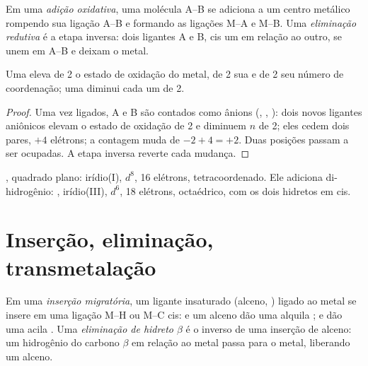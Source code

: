 \begin{definition}\label{def:b2:catalytic-cycles:oxidative-addition}
Em uma \emph{adição oxidativa}, uma molécula A--B se
adiciona a um centro metálico rompendo sua ligação A--B e formando as ligações
M--A e M--B. Uma \emph{eliminação redutiva} é a
etapa inversa: dois ligantes A e B, cis um em relação ao outro, se unem em
A--B e deixam o metal.
\end{definition}

\begin{proposition}\label{prop:b2:catalytic-cycles:oa}
Uma  eleva de 2 o estado de oxidação do metal, de 2 sua
 e de 2 seu número de coordenação; uma
 diminui cada um de 2.
\end{proposition}

\begin{proof}
Uma vez ligados, A e B são contados como ânions (, , ):
dois novos ligantes aniônicos elevam o estado de oxidação de 2 e diminuem $n$
de 2; eles cedem dois pares, $+4$ elétrons; a contagem muda de $-2 + 4 = +2$.
Duas posições passam a ser ocupadas. A etapa inversa reverte cada mudança.
\end{proof}

\begin{example}\label{ex:b2:catalytic-cycles:vaska}
, quadrado plano: irídio(I), $d^8$, 16 elétrons, tetracoordenado.
Ele adiciona di-hidrogênio: , irídio(III), $d^6$, 18 elétrons,
octaédrico, com os dois hidretos em cis.
\end{example}

\section{Inserção, eliminação, transmetalação}

\begin{definition}\label{def:b2:catalytic-cycles:insertion}
Em uma \emph{inserção migratória}, um ligante insaturado
(alceno, ) ligado ao metal se insere em uma ligação M--H ou M--C cis:  e
um alceno dão uma alquila ;  e  dão uma acila .
Uma \emph{eliminação de hidreto $\beta$}
é o inverso de uma inserção de alceno: um hidrogênio do carbono $\beta$ em
relação ao metal passa para o metal, liberando um alceno.
\end{definition}

